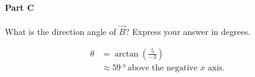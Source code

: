 \setcounter{partcounter}{3}
\paragraph{Part C}

What is the direction angle of $\vec{B}$? Express your answer in degrees.

\begin{solution}
	\begin{align*}
		\theta &= \arctan \left( \frac{5}{-3} \right) \\
		&\approx \SI{59}{\degree} ~ \text{above the negative $x$ axis}
		.\end{align*}
\end{solution}
